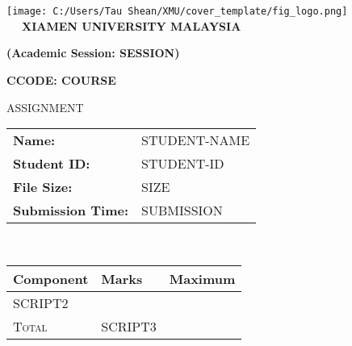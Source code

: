 \documentclass[12pt]{article}
\begin{document}
\begin{center}
	 \texttt{[image: C:/Users/Tau Shean/XMU/cover\_template/fig\_logo.png]}\\
	 \verb|  |
	 \centering
	 {\large \textbf{\textsf{XIAMEN UNIVERSITY MALAYSIA}}}

	 \textbf{\textsf{(Academic Session: SESSION)}}
	 
	 \vspace{20pt}
	 {\Large {\textbf{CCODE: COURSE
	 }}}
	 
	 
	 \vspace{5pt}
	 {\LARGE \textsc{ASSIGNMENT}}
	
	\vspace{15pt}
	
	\begin{tabularx}{1\textwidth} { 
		   >{\raggedleft\arraybackslash\hsize=0.5\hsize}X 
		   >{\raggedright\arraybackslash\hsize=0.5\hsize}X }
		\textbf{Name:} & STUDENT-NAME \\ 
		
		\textbf{Student ID:} & STUDENT-ID \\   
		
		\textbf{File Size:} & SIZE \\  
		
		\textbf{Submission Time:} & SUBMISSION \\
	\end{tabularx}
	\\
	\vspace{30pt}
	\setlength\arrayrulewidth{1pt}
	\def\arraystretch{1.75}
	\begin{tabularx}{0.8\textwidth}{
			|>{\centering\arraybackslash\hsize=0.5\hsize}X|
			>{\centering\arraybackslash\hsize=0.25\hsize}X|
			>{\centering\arraybackslash\hsize=0.25\hsize}X|
		}	
		\hline
		\rowcolor{LightOrange}
		\textbf{Component}& \textbf{Marks} & \textbf{Maximum} \\  \hline
		SCRIPT2 \\ \hline
		\rowcolor{LightBlue}
		\textsc{Total} &  SCRIPT3  \\ \hline
	\end{tabularx}
\end{center}
\end{document}
